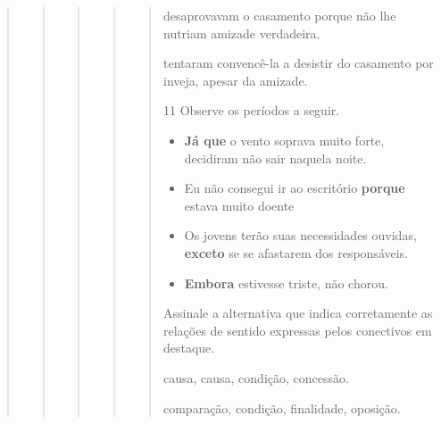 \begin{quote}
\begin{quote}
\begin{quote}
\begin{quote}
\begin{quote}
\begin{escolha}
    \item desaprovavam o casamento porque não lhe nutriam amizade verdadeira.

    \item tentaram convencê-la a desistir do casamento por inveja, apesar da amizade.

\end{escolha}


\num{11} Observe os períodos a seguir.

\begin{itemize}

    \item \textbf{Já que} o vento soprava muito forte, decidiram não sair
naquela noite.

    \item Eu não consegui ir ao escritório \textbf{porque} estava muito doente

    \item Os jovens terão suas necessidades ouvidas, \textbf{exceto} se se
afastarem dos responsáveis.

    \item \textbf{Embora} estivesse triste, não chorou.

\end{itemize}

Assinale a alternativa que indica corretamente as relações de sentido
expressas pelos conectivos em destaque.

\begin{escolha}

    \item causa, causa, condição, concessão.

    \item comparação, condição, finalidade, oposição.


\end{escolha}
\end{quote}
\end{quote}
\end{quote}
\end{quote}
\end{quote}
